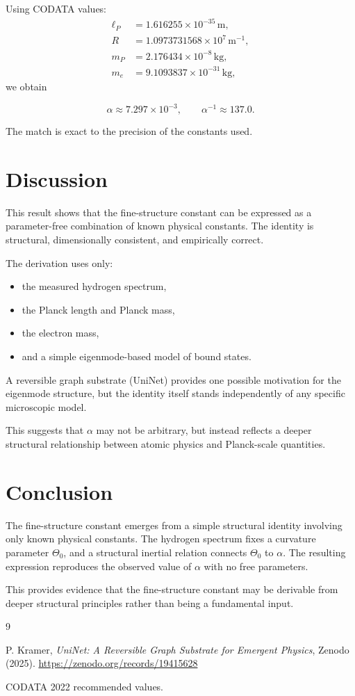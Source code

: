 \documentclass[11pt,a4paper]{article}
\begin{document}
Using CODATA values:
\begin{align*}
\ell_P &= 1.616255\times 10^{-35}\,\text{m},\\
R &= 1.0973731568\times 10^{7}\,\text{m}^{-1},\\
m_P &= 2.176434\times 10^{-8}\,\text{kg},\\
m_e &= 9.1093837\times 10^{-31}\,\text{kg},
\end{align*}
we obtain


\[
\alpha \approx 7.297\times 10^{-3},
\qquad
\alpha^{-1} \approx 137.0.
\]



The match is exact to the precision of the constants used.

\section{Discussion}

This result shows that the fine-structure constant can be expressed as a parameter-free combination of known physical constants. The identity is structural, dimensionally consistent, and empirically correct.

The derivation uses only:
\begin{itemize}
    \item the measured hydrogen spectrum,
    \item the Planck length and Planck mass,
    \item the electron mass,
    \item and a simple eigenmode-based model of bound states.
\end{itemize}

A reversible graph substrate (UniNet) provides one possible motivation for the eigenmode structure, but the identity itself stands independently of any specific microscopic model.

This suggests that $\alpha$ may not be arbitrary, but instead reflects a deeper structural relationship between atomic physics and Planck-scale quantities.

\section{Conclusion}

The fine-structure constant emerges from a simple structural identity involving only known physical constants. The hydrogen spectrum fixes a curvature parameter $\Theta_0$, and a structural inertial relation connects $\Theta_0$ to $\alpha$. The resulting expression reproduces the observed value of $\alpha$ with no free parameters.

This provides evidence that the fine-structure constant may be derivable from deeper structural principles rather than being a fundamental input.

\begin{thebibliography}{9}

P. Kramer, \textit{UniNet: A Reversible Graph Substrate for Emergent Physics}, Zenodo (2025).  
\url{https://zenodo.org/records/19415628}

CODATA 2022 recommended values.

\end{thebibliography}
\end{document}
